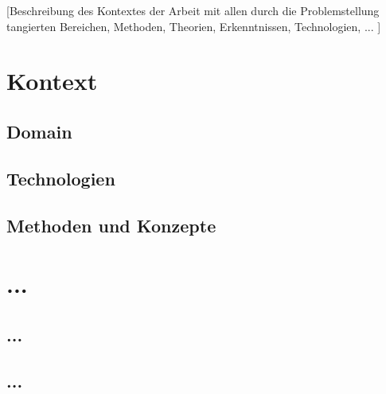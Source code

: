 [Beschreibung des Kontextes der Arbeit mit allen durch die Problemstellung tangierten Bereichen, Methoden, Theorien, Erkenntnissen, Technologien, ... ]


\section{Kontext}


\subsection{Domain}



\subsection{Technologien}


\subsection{Methoden und Konzepte}


\section{...}


\subsection{...}


\subsection{...}
